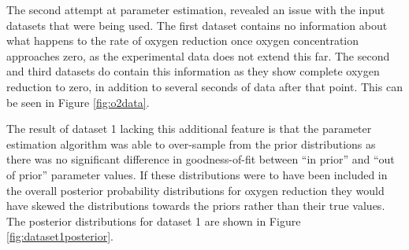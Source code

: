 The second attempt at parameter estimation, revealed an issue with the input datasets that were being used. The first dataset contains no information about what happens to the rate of oxygen reduction once oxygen concentration approaches zero, as the experimental data does not extend this far. The second and third datasets do contain this information as they show complete oxygen reduction to zero, in addition to several seconds of data after that point. This can be seen in Figure \ref{fig:o2data}.

The result of dataset 1 lacking this additional feature is that the parameter estimation algorithm was able to over-sample from the prior distributions as there was no significant difference in goodness-of-fit between ``in prior'' and ``out of prior'' parameter values. If these distributions were to have been included in the overall posterior probability distributions for oxygen reduction they would have skewed the distributions towards the priors rather than their true values. The posterior distributions for dataset 1 are shown in Figure \ref{fig:dataset1posterior}.

